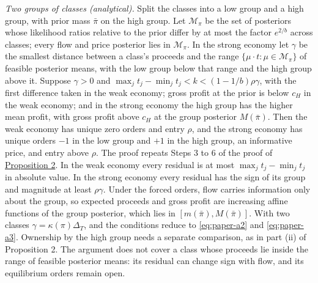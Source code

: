 \emph{Two groups of classes (analytical).} Split the classes into a low
group and a high group, with prior mass \(\bar\pi\) on the high group.
Let \(\mathcal M_\pi\) be the set of posteriors whose likelihood ratios
relative to the prior differ by at most the factor \(e^{2/b}\) across
classes; every flow and price posterior lies in \(\mathcal M_\pi\). In
the strong economy let \(\gamma\) be the smallest distance between a
class's proceeds and the range \(\{\mu\cdot t:\mu\in\mathcal M_\pi\}\)
of feasible posterior means, with the low group below that range and
the high group above it. Suppose \(\gamma>0\) and
\(\max_jt_j-\min_jt_j<k<(1-1/b)\rho\gamma\), with the first difference
taken in the weak economy; gross profit at the prior is below \(c_H\) in
the weak economy; and in the strong economy the high group has the
higher mean profit, with gross profit above \(c_H\) at the group
posterior \(M(\bar\pi)\). Then the weak economy has unique zero orders
and entry \(\rho\), and the strong economy has unique orders \(-1\) in
the low group and \(+1\) in the high group, an informative price, and
entry above \(\rho\). The proof repeats Steps 3 to 6 of the proof of
\hyperref[result-proposition-2]{Proposition 2}. In the weak economy
every residual is at most \(\max_jt_j-\min_jt_j\) in absolute value. In
the strong economy every residual has the sign of its group and
magnitude at least \(\rho\gamma\). Under the forced orders, flow
carries information only about the group, so expected proceeds and
gross profit are increasing affine functions of the group posterior,
which lies in \([m(\bar\pi),M(\bar\pi)]\). With two classes
\(\gamma=\kappa(\pi)\Delta_T\), and the conditions reduce to
\eqref{eq:paper-a2} and \eqref{eq:paper-a3}. Ownership by the high group
needs a separate comparison, as in part (ii) of Proposition 2. The
argument does not cover a class whose proceeds lie inside the range of
feasible posterior means: its residual can change sign with flow, and
its equilibrium orders remain open.
